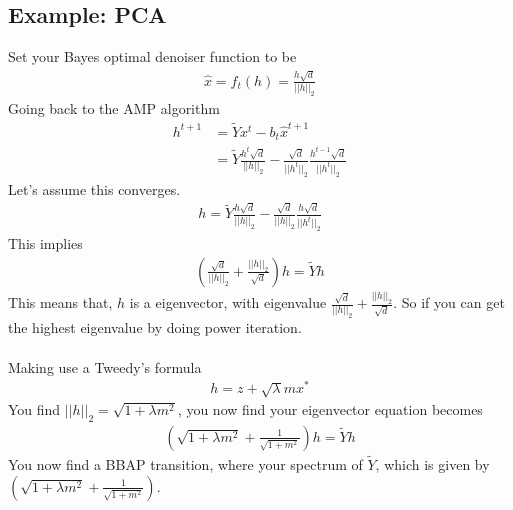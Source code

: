 \subsection{Example: PCA}
Set your Bayes optimal denoiser function to be
\begin{align}
	\hat x = f_t(h) = \frac{h \sqrt{d}}{|| h||_2}
\end{align}
Going back to the AMP algorithm
\begin{align}
	h^{t+1} & = \tilde Y x^t - b_t \hat x^{t+1}\\
	& = \tilde Y \frac{h^t \sqrt{d}}{|| h ||_2	} - \frac{\sqrt{d}}{|| h^t||_2} \frac{h^{t-1} \sqrt{d}}{||h^t||_2}
\end{align}
Let's assume this converges.
\begin{align}
	h = \tilde Y \frac{h \sqrt{d}}{|| h ||_2	} - \frac{\sqrt{d}}{|| h||_2} \frac{h \sqrt{d}}{||h^t||_2}
\end{align}
This implies
\begin{align}
	\left ( \frac{\sqrt{d}}{|| h||_2} + \frac{||h||_2}{\sqrt{d}} \right) h = \tilde Y h
\end{align}
This means that, $h$ is a eigenvector, with eigenvalue  $\frac{\sqrt{d}}{|| h||_2} + \frac{||h||_2}{\sqrt{d}}$. So if you can get the highest eigenvalue by doing power iteration.\\
\\
Making use a Tweedy's formula
\begin{align}
	h = z + \sqrt{\lambda} m x^*
\end{align}
You find $||h||_2 = \sqrt{1 + \lambda m^2}$, you now find your eigenvector equation becomes
\begin{align}
	\left ( \sqrt{1 + \lambda m^2} + \frac{1}{\sqrt{1 + m^2}}\right) h = \tilde Y h
\end{align}
You now find a BBAP transition, where your spectrum of $\tilde Y$, which is given by  $\left ( \sqrt{1 + \lambda m^2} + \frac{1}{\sqrt{1 + m^2}}\right)$.


